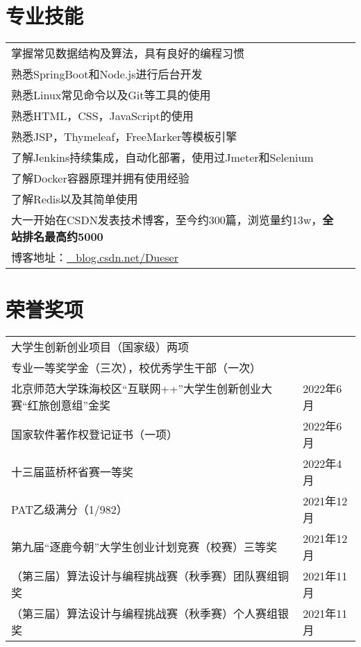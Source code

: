 \documentclass[a4paper,8pt]{article}
\begin{document}
\section{专业技能}
\begin{tabularx}{\linewidth}{@{}l X@{}}

掌握常见数据结构及算法，具有良好的编程习惯 \\
熟悉SpringBoot和Node.js进行后台开发 \\
熟悉Linux常见命令以及Git等工具的使用 \\
熟悉HTML，CSS，JavaScript的使用 \\
熟悉JSP，Thymeleaf，FreeMarker等模板引擎 \\
了解Jenkins持续集成，自动化部署，使用过Jmeter和Selenium \\
了解Docker容器原理并拥有使用经验 \\
了解Redis以及其简单使用 \\
大一开始在CSDN发表技术博客，至今约300篇，浏览量约13w，\textbf{全站排名最高约5000} \\
博客地址：\href{https://blog.csdn.net/Dueser}{\raisebox{-0.05\height} \ blog.csdn.net/Dueser} 
\end{tabularx}

\section{荣誉奖项}
\begin{tabularx}{\linewidth}{@{}l X@{}}
    大学生创新创业项目（国家级）两项 \\
    专业一等奖学金（三次），校优秀学生干部（一次）\\
    北京师范大学珠海校区“互联网++”大学生创新创业大赛“红旅创意组”金奖 & \hfill \normalsize 2022年6月\\
    国家软件著作权登记证书（一项） & \hfill \normalsize 2022年6月\\
    十三届蓝桥杯省赛一等奖 & \hfill \normalsize 2022年4月\\
    PAT乙级满分（1/982） & \hfill \normalsize 2021年12月\\
    第九届“逐鹿今朝”大学生创业计划竞赛（校赛）三等奖 & \hfill \normalsize 2021年12月\\
    （第三届）算法设计与编程挑战赛（秋季赛）团队赛组铜奖 & \hfill \normalsize 2021年11月\\
    （第三届）算法设计与编程挑战赛（秋季赛）个人赛组银奖 & \hfill \normalsize 2021年11月\\
\end{tabularx}
\end{document}
